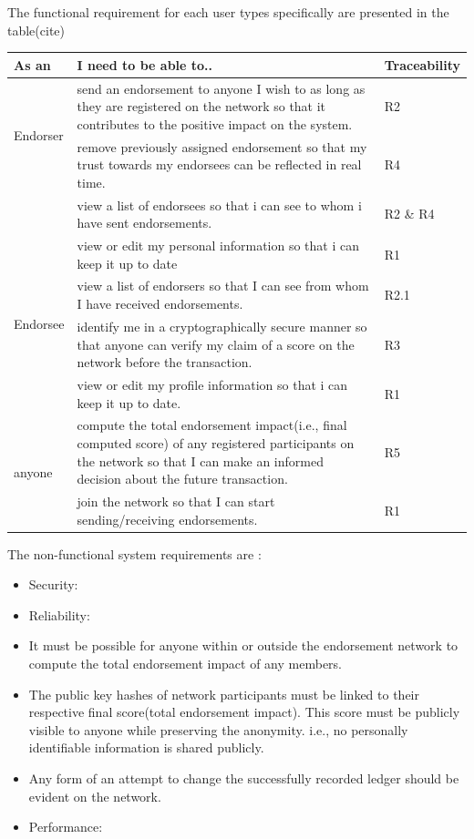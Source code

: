 The functional requirement for each user types specifically are presented 
in the table(cite)
\begin{center}
	\begin{tabular} {| l | p{9cm} | l |}
		\hline
		\textbf{As an}  & \textbf{I need to be able to..}   & \textbf{Traceability} \\
		\hline
		\multirow{2}{*}{Endorser} &  send an endorsement to anyone I wish to as
		long as they are registered on the network so that it contributes to
		the positive impact on the system.& R2
		\\\cline{2-3} 
		& remove previously assigned endorsement so that my trust towards my
		endorsees can be reflected in real time.  & R4 \\\cline{2-3}
		& view a list of endorsees so that i can see to whom i have sent
		endorsements.& R2 \& R4 \\\cline{2-3}
		& view or edit my personal information so that i can keep it up to
		date& R1 \\\cline{2-3}
		\hline
		\multirow{2}{*}{Endorsee} & view a list of endorsers so that I can see
		from whom I have received endorsements.& R2.1 \\\cline{2-3}
		& identify me in a cryptographically secure manner so that anyone can
		verify my claim of a score on the network before the transaction. & R3 
		\\\cline{2-3}
		& view or edit my profile information so that i can keep it up to date.
		& R1 \\\cline{2-3}
		\hline
		\multirow{2}{*}{anyone} & compute the total endorsement
		impact(i.e., final computed score) of any registered participants on
		the network so that I can make an informed decision about the future
		transaction.  & R5 \\\cline{2-3}
		& join the network so that I can start sending/receiving endorsements.
		& R1 \\\cline{2-3}
		\hline
	\end{tabular}
\end{center}

The non-functional system requirements are : \\ 
\begin{itemize}
\item Security: 
\item Reliability: 
	\item It must be possible for anyone within or outside the endorsement
		network to compute the total endorsement impact of any members.
	\item The public key hashes of network participants must be linked to their
		respective final score(total endorsement impact). This score must be
		publicly visible to anyone while preserving the anonymity. i.e., no
		personally identifiable information is shared publicly.
	\item Any form of an attempt to change the successfully recorded ledger
		should be evident on the network. 
\item Performance: 
\end{itemize}

